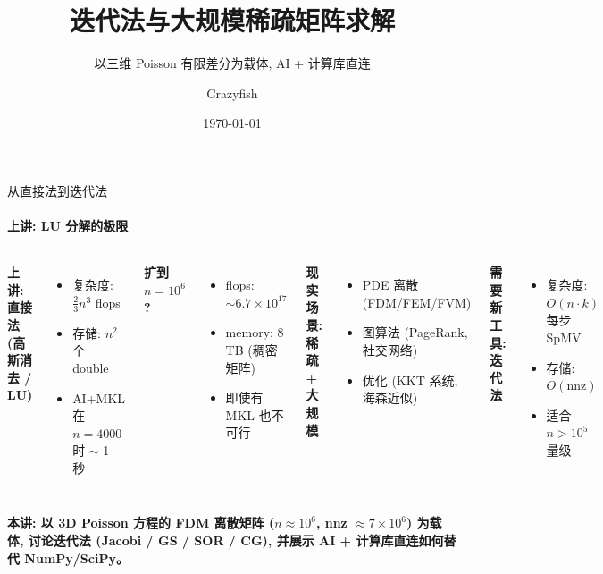 \documentclass[12pt,aspectratio=169]{beamer}
\title{迭代法与大规模稀疏矩阵求解}
\subtitle{以三维 Poisson 有限差分为载体, AI + 计算库直连}
\author{Crazyfish}
\date{\today}
\begin{document}
\begin{frame}
\titlepage
\end{frame}

\begin{frame}[shrink]{从直接法到迭代法}
\framesubtitle{上讲: LU 分解的极限}

\begin{columns}[T]
\textbf{上讲: 直接法 (高斯消去 / LU)}
\begin{itemize}
  \item 复杂度: $\frac{2}{3}n^3$ flops
  \item 存储: $n^2$ 个 double
  \item AI+MKL 在 $n=4000$ 时 $\sim$ 1 秒
\end{itemize}

\vspace{4pt}
\textbf{扩到 $n=10^6$?}
\begin{itemize}
  \item flops: $\sim 6.7 \times 10^{17}$
  \item memory: 8 TB (稠密矩阵)
  \item 即使有 MKL 也不可行
\end{itemize}

\textbf{现实场景: 稀疏 + 大规模}
\begin{itemize}
  \item PDE 离散 (FDM/FEM/FVM)
  \item 图算法 (PageRank, 社交网络)
  \item 优化 (KKT 系统, 海森近似)
\end{itemize}

\vspace{4pt}
\textbf{需要新工具: 迭代法}
\begin{itemize}
  \item 复杂度: $O(n \cdot k)$ 每步 SpMV
  \item 存储: $O(\text{nnz})$
  \item 适合 $n > 10^5$ 量级
\end{itemize}
\end{columns}

\vspace{6pt}
\begin{block}{}
\small \textbf{本讲: 以 3D Poisson 方程的 FDM 离散矩阵 ($n \approx 10^6$, nnz $\approx 7 \times 10^6$) 为载体, 讨论迭代法 (Jacobi / GS / SOR / CG), 并展示 AI + 计算库直连如何替代 NumPy/SciPy。}
\end{block}
\end{frame}
\end{document}
